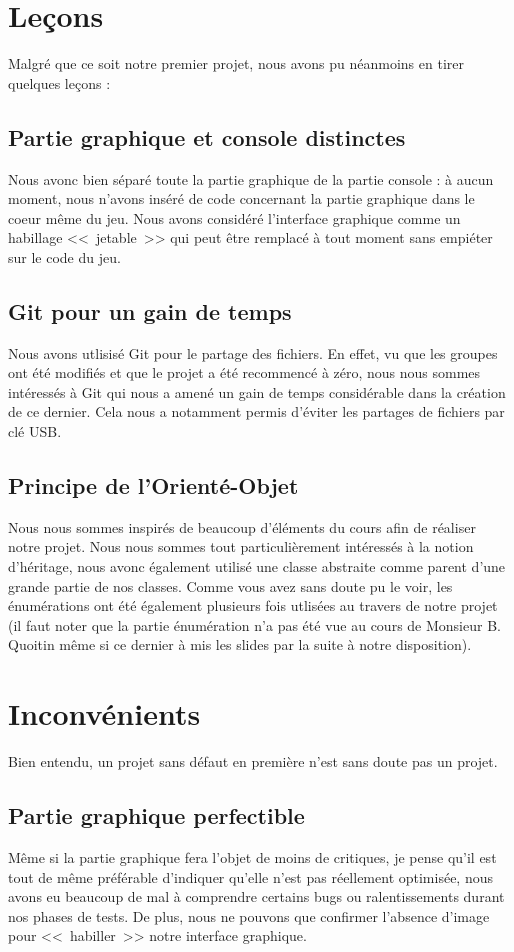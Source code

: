 \documentclass[10pt]{article}
\begin{document}
\section{Leçons}
Malgré que ce soit notre premier projet, nous avons pu néanmoins en tirer quelques leçons :
\subsection{Partie graphique et console distinctes}
Nous avonc bien séparé toute la partie graphique de la partie console : à aucun moment, nous n'avons inséré de code concernant la partie  graphique dans le coeur même du jeu. Nous avons considéré l'interface graphique comme un habillage <<~jetable~>> qui peut être remplacé à tout moment sans empiéter sur le code du jeu.
\subsection{Git pour un gain de temps }
 Nous avons utlisisé Git pour le partage des fichiers. En effet, vu que les groupes ont été modifiés et que le projet a été recommencé à zéro, nous nous sommes intéressés à Git qui nous a amené un gain de temps considérable dans la création de ce dernier.
Cela nous a notamment permis d'éviter les partages de fichiers par clé USB.

\subsection{Principe de l'Orienté-Objet}
Nous nous sommes inspirés de beaucoup d'éléments du cours afin de réaliser notre projet. Nous nous sommes tout particulièrement intéressés à la notion d'héritage, nous avonc également utilisé une classe abstraite comme parent d'une grande partie de nos classes. Comme vous avez sans doute pu le voir, les énumérations ont été également plusieurs fois utlisées au travers de notre projet (il faut noter que la partie énumération n'a pas été vue au cours de Monsieur B. Quoitin même si ce dernier à mis les slides par la suite à notre disposition).

 
\section{Inconvénients}
Bien entendu, un projet sans défaut en première n'est sans doute pas un projet.
\subsection{Partie graphique perfectible}
 Même si la partie graphique fera l'objet de moins de critiques, je pense qu'il est tout de même préférable d'indiquer qu'elle n'est pas réellement optimisée, nous avons eu beaucoup de mal à comprendre certains bugs ou ralentissements durant nos phases de tests.
De plus, nous ne pouvons que confirmer l'absence d'image pour <<~habiller~>> notre interface graphique.
\end{document}

